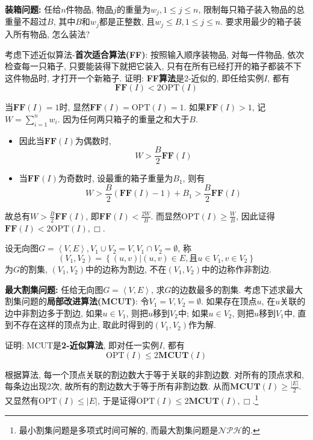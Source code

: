 \documentclass{article}
\begin{document}
\pagebreak


\begin{homeworkProblem}
    \textbf{装箱问题:} 任给$n$件物品, 物品$j$的重量为$w_j, 1\leq j\leq n$, 限制每只箱子装入物品的总重量不超过$B$, 其中$B$和$w_j$都是正整数, 且$w_j\leq B,1\leq j\leq n$. 要求用最少的箱子装入所有物品, 怎么装法?

    考虑下述近似算法-\textbf{首次适合算法(FF)}: 按照输入顺序装物品, 对每一件物品, 依次检查每一只箱子, 只要能装得下就把它装入, 只有在所有已经打开的箱子都装不下这件物品时, 才打开一个新箱子. 证明: \textbf{FF算法}是2-近似的, 即任给实例$I$, 都有$$\textbf{FF}(I)< 2\text{OPT}(I)$$

    \solution 当$\textbf{FF}(I)=1$时, 显然$\textbf{FF}(I)=\text{OPT}(I)=1$. 如果$\textbf{FF}(I)>1$, 记$\displaystyle W=\sum_{i=1}^n{w_i}$. 因为任何两只箱子的重量之和大于$B$. 
    \begin{itemize}
        \item 因此当$\textbf{FF}(I)$为偶数时, $$\displaystyle W>\frac{B}{2}\textbf{FF}(I)$$
        \item 当$\textbf{FF}(I)$为奇数时, 设最重的箱子重量为$B_1$, 则有$$\displaystyle W>\frac{B}{2}\left( \textbf{FF}\left( I \right) -1 \right) +B_1>\frac{B}{2}\textbf{FF}\left( I \right)$$
    \end{itemize}
    故总有$\displaystyle W>\frac{B}{2}\textbf{FF}(I)$, 即$\displaystyle \textbf{FF}(I)<\frac{2W}{B}$. 而显然$\displaystyle \text{OPT}(I)\geq \frac{W}{B}$, 因此证得$\textbf{FF}(I)<2\text{OPT}(I),\Box$.
\end{homeworkProblem}


\begin{homeworkProblem}
    设无向图$G=\left< V,E \right>, V_1\cup V_2=V, V_1\cap V_2=\emptyset$, 称$$\left( V_1,V_2 \right) =\left\{ \left( u,v \right) \big|\left( u,v \right) \in E,\text{且}u\in V_1,v\in V_2 \right\} 
    $$
    为$G$的割集, $(V_1,V_2)$中的边称为割边, 不在$(V_1,V_2)$中的边称作非割边.

    \textbf{最大割集问题:} 任给无向图$G=\left<V,E\right>$, 求$G$的边数最多的割集. 考虑下述求最大割集问题的\textbf{局部改进算法(MCUT)}: 令$V_1=V,V_2=\emptyset$. 如果存在顶点$u$, 在$u$关联的边中非割边多于割边, 如果$u\in V_1$, 则把$u$移到$V_2$中; 如果$u\in V_2$, 则把$u$移到$V_1$中, 直到不存在这样的顶点为止, 取此时得到的$(V_1,V_2)$作为解.

    证明: MCUT是\textbf{2-近似算法}, 即对任一实例$I$, 都有$$\text{OPT}(I)\leq 2\textbf{MCUT}(I)$$

    \solution 根据算法, 每一个顶点关联的割边数大于等于关联的非割边数. 对所有的顶点求和, 每条边出现2次, 故所有的割边数大于等于所有非割边数. 从而$\displaystyle \textbf{MCUT}(I)\geq \frac{|E|}{2}$. 又显然有$\text{OPT}(I)\leq |E|$, 于是证得$\text{OPT}(I)\leq 2\textbf{MCUT}(I),\Box.$\footnote{最小割集问题是多项式时间可解的, 而最大割集问题是$\mathcal{NPH}$的.}
    \newpage
\end{homeworkProblem}
\end{document}
